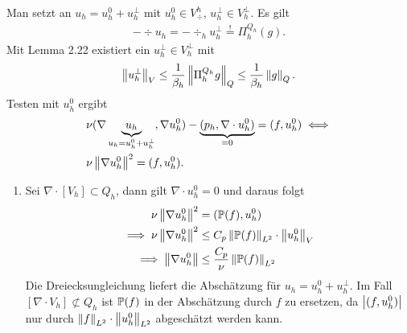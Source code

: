 \begin{beweis}
  Man setzt an $u_{h} = u_{h}^{0} + u_{h}^{\perp}$ mit $u_{h}^{0} \in V_{\div}^{h}$, $u_{h}^{\perp}\in V_{h}^{\perp}$. Es gilt
  \begin{align*}
    - \div u_{h} = - \div_{h} u_{h}^{\perp} \stackrel != \Pi_{h}^{Q_{h}}(g). 
  \end{align*}
  Mit Lemma 2.22 existiert ein $u_{h}^{\perp} \in V_{h}^{\perp}$ mit
  \begin{align*}
    \nnorm{u_{h}^{\perp}}_{V} \leq \frac 1 {\beta_{h}}\nnorm{\Pi_{h}^{Q_{h}}g}_{Q} \leq \frac 1 {\beta_{h}} \nnorm{g}_{Q}. 
  \end{align*}
  Testen mit $u_{h}^{0}$ ergibt
  \begin{align*}
    &  \nu(\nabla \underbrace{u_{h}}_{u_{h} = u_{h}^{0} + u_{h}^{\perp}}, \nabla u_{h}^{0}) - \underbrace{(p_{h}, \nabla\cdot u_{h}^{0})}_{= 0} = (f, u_{h}^{0}) \iff\\
    & \nu\nnorm{\nabla u_{h}^{0}}^{2} = (f, u_{h}^{0}). 
  \end{align*}
  \begin{enumerate}
  \item Sei $\nabla\cdot [V_{h}]\subset Q_{h}$, dann gilt $\nabla\cdot u_{h}^{0} = 0$ und daraus folgt
    \begin{align*}
      \nu \nnorm{\nabla u_{h}^{0}}^{2} &= (\P(f), u_{h}^{0})\\
      \implies \nu \nnorm{\nabla u_{h}^{0}}^{2} &\leq C_{p}\nnorm{\P(f)}_{L^{2}} \cdot \nnorm{u_{h}^{0}}_{V}\\
      \implies \nnorm{\nabla u_{h}^{0}} &\leq \frac{C_{p}}\nu \nnorm{\P(f)}_{L^{2}}
    \end{align*}
    Die Dreiecksungleichung liefert die Abschätzung für $u_{h} = u_{h}^{0} + u_{h}^{\perp}$. Im Fall $[\nabla\cdot V_{h}]\not \subset Q_{h}$ ist $\P(f)$ in der Abschätzung durch $f$ zu ersetzen, da $\norm{(f, u_{h}^{0})}$ nur durch $\nnorm f_{L^{2}} \cdot \nnorm{u_{h}^{0}}_{L^{2}}$ abgeschätzt werden kann. 
\end{enumerate}
  \end{beweis}
